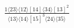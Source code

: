\documentclass[varwidth, border=5pt]{standalone}
\begin{document}
\begin{my}
$\begin{gathered}
\scriptscriptstyle\frac{1⟨23⟩⟨12⟩[14]⟨34⟩[13]^2}{⟨13⟩⟨14⟩[15]^3⟨24⟩⟨35⟩}
\end{gathered}$
\end{my}
\end{document}

